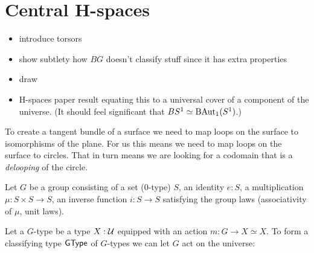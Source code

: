 \section{Central H-spaces}

\begin{itemize}
\item introduce torsors
\item show subtlety how \( BG \) doesn't classify stuff since it has extra properties
\item draw 
\item H-spaces paper result equating this to a universal cover of a component of the universe. (It should feel significant that \( BS^1\simeq \mathrm{BAut}_1(S^1) \).)
\end{itemize}

To create a tangent bundle of a surface we need to map loops on the surface to isomorphisms of the plane. For us this means we need to map loops on the surface to circles. That in turn means we are looking for a codomain that is a \emph{delooping} of the circle.

Let \( G \) be a group consisting of a set (0-type) \( S \), an identity \( e:S \), a multiplication \( \mu:S\times S \to S \), an inverse function \( i:S\to S \) satisfying the group laws (associativity of \( \mu \), unit laws). 

Let a \( G \)-type be a type \( X:\mathcal{U} \) equipped with an action \( m:G\to X\simeq X \). To form a classifying type \( \mathsf{GType} \) of \( G \)-types we can let \( G \) act on the universe:

